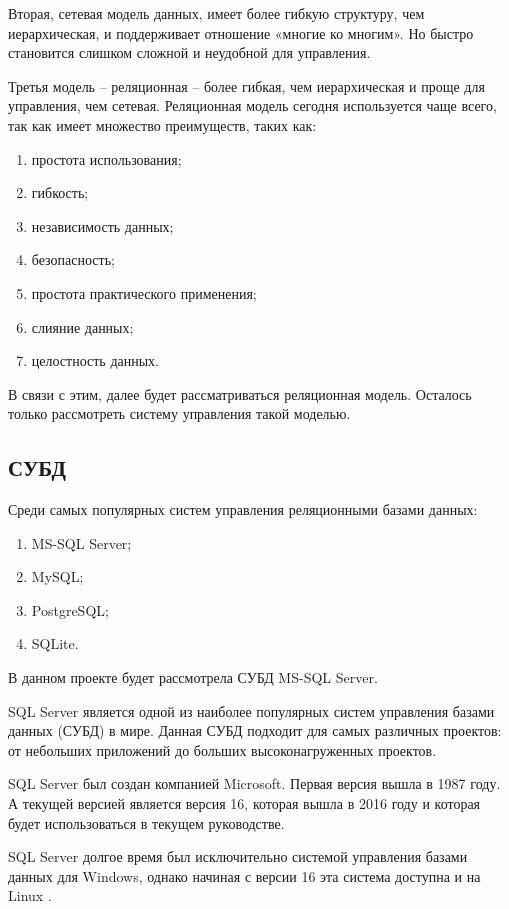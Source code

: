 Вторая, сетевая модель данных, имеет более гибкую структуру, чем иерархическая, и поддерживает отношение «многие ко многим». Но быстро становится слишком сложной и неудобной для управления.

Третья модель – реляционная – более гибкая, чем иерархическая и проще для управления, чем сетевая. Реляционная модель сегодня используется чаще всего, так как имеет множество преимуществ, таких как:

\begin{enumerate}
	\item простота использования;
	\item гибкость;
	\item независимость данных;
	\item безопасность;
	\item простота практического применения;
	\item слияние данных;
	\item целостность данных.
\end{enumerate}

В связи с этим, далее будет рассматриваться реляционная модель. Осталось только рассмотреть систему управления такой моделью.

\subsection*{СУБД}%

Среди самых популярных систем управления реляционными базами данных:
\begin{enumerate}
	\item MS-SQL Server;
	\item MySQL;
	\item PostgreSQL; 
	\item SQLite.
\end{enumerate}

В данном проекте будет рассмотрела СУБД MS-SQL Server.

SQL Server является одной из наиболее популярных систем управления базами данных (СУБД) в мире. Данная СУБД подходит для самых различных проектов: от небольших приложений до больших высоконагруженных проектов.

SQL Server был создан компанией Microsoft. Первая версия вышла в 1987 году. А текущей версией является версия 16, которая вышла в 2016 году и которая будет использоваться в текущем руководстве.

SQL Server долгое время был исключительно системой управления базами данных для Windows, однако начиная с версии 16 эта система доступна и на Linux \cite{litlink2}. 

